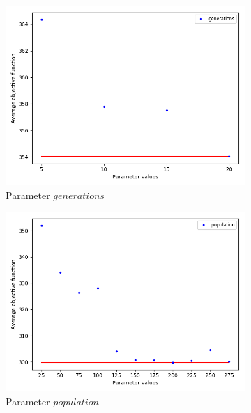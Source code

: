 \begin{figure}[H]
\begin{subfigure}[b]{.49\linewidth}
\centering
\includegraphics[width=\linewidth]{./img/best-generation.png}
\caption{ Parameter $generations$}\label{fig2a}
\end{subfigure}\hfill
\begin{subfigure}[b]{.49\linewidth}
\centering
\includegraphics[width=\linewidth]{./img/best-population.png}
\caption{Parameter $population$ }\label{fig2b}
\end{subfigure}\vfill
\begin{subfigure}[b]{.49\linewidth}
\centering

\end{subfigure}
\end{figure}

